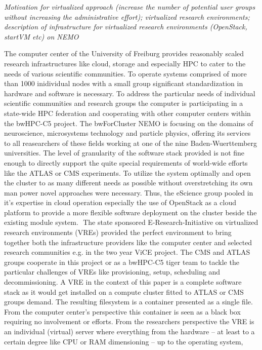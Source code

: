 \textit{Motivation for virtualized approach (increase the number of potential
user groups without increasing the administrative effort); virtualized
research environments; description of infrastructure for virtualized research environments
(OpenStack, startVM etc) on NEMO }

The computer center of the University of Freiburg provides reasonably scaled research
infrastructures like cloud, storage and especially HPC to cater to the needs of various
scientific communities. To operate systems comprised of more than 1000 inidividual nodes
with a small group significant standardization in hardware and software is necessary. To
address the particular needs of individual scientific communities and research groups the
computer is participating in a state-wide HPC federation and cooperating with other
computer centers within the bwHPC-C5 project. The bwForCluster NEMO is focusing on the
domains of neuroscience, microsystems technology and particle physics, offering its
services to all reasearchers of these fields working at one of the nine Baden-Wuerttemberg
universities. The level of granularity of the software stack provided is not fine enough to
directly support the quite special requirements of world-wide efforts like the ATLAS or CMS
experiments. To utilize the system optimally and open the cluster to as many different
needs as possible without overstretching its own man power novel approaches were
necessary. Thus, the eScience group pooled in it's expertise in cloud operation especially
the use of OpenStack as a cloud platform to provide a more flexible software deployment
on the cluster beside the existing module system.
 The state sponsored E-Research-Initiative on virtualized research environments (VREs)
provided the perfect environment to bring together both the infrastructure providers like
the computer center and selected research communities e.g. in the two year ViCE project.
The CMS and ATLAS groups cooperate in this project or as a bwHPC-C5 tiger team to tackle
the particular challenges of VREs like provisioning, setup, scheduling and decommissioning.
A VRE in the context of this paper is a complete software stack as it would get installed on a
compute cluster fitted to ATLAS or CMS groups demand. The resulting filesystem is a
container presented as a single file. From the computer center's perspective this container
is seen as a black box requiring no involvement or efforts. From the researchers
perspective the VRE is an individual (virtual) server where everything from the hardware --
at least to a certain degree like CPU or RAM dimensioning -- up to the operating system,
